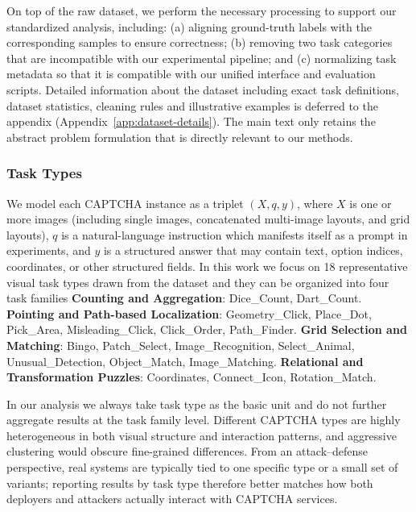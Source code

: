 \documentclass[sigconf, review]{acmart}
\begin{document}
On top of the raw dataset, we perform the necessary processing to support our standardized analysis, including: (a) aligning ground-truth labels with the corresponding samples to ensure correctness; (b) removing two task categories that are incompatible with our experimental pipeline; and (c) normalizing task metadata so that it is compatible with our unified interface and evaluation scripts. Detailed information about the dataset including exact task definitions, dataset statistics, cleaning rules and illustrative examples is deferred to the appendix (Appendix~\ref{app:dataset-details}). The main text only retains the abstract problem formulation that is directly relevant to our methods.



\subsubsection{Task Types}

We model each CAPTCHA instance as a triplet $(X, q, y)$, where $X$ is one or more images (including single images, concatenated multi-image layouts, and grid layouts), $q$ is a natural-language instruction which manifests itself as a prompt in experiments, and $y$ is a structured answer that may contain text, option indices, coordinates, or other structured fields. In this work we focus on 18 representative visual task types drawn from the dataset and they can be organized into four task families
\textbf{Counting and Aggregation}: Dice\_Count, Dart\_Count.
\textbf{Pointing and Path-based Localization}: Geometry\_Click, Place\_Dot, Pick\_Area, Misleading\_Click, Click\_Order, Path\_Finder.
\textbf{Grid Selection and Matching}: Bingo, Patch\_Select, Image\_Recognition, Select\_Animal, Unusual\_Detection, Object\_Match, Image\_Matching.
\textbf{Relational and Transformation Puzzles}: Coordinates, Connect\_Icon, Rotation\_Match.



In our analysis we always take task type as the basic unit and do not further aggregate results at the task family level. Different CAPTCHA types are highly heterogeneous in both visual structure and interaction patterns, and aggressive clustering would obscure fine-grained differences. From an attack--defense perspective, real systems are typically tied to one specific type or a small set of variants; reporting results by task type therefore better matches how both deployers and attackers actually interact with CAPTCHA services.
\end{document}
